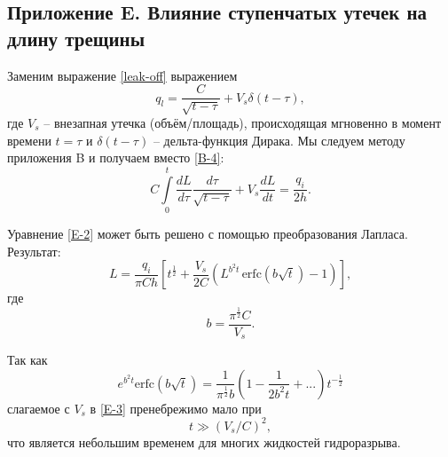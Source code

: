 \documentclass[a4paper, 11pt]{article}
\newcommand{\beq}{\begin{equation}}
\newcommand{\eeq}{\end{equation}}
\begin{document}
\subsection{Приложение E. Влияние ступенчатых утечек на длину трещины}

Заменим выражение \eqref{leak-off} выражением
\beq\label{E-1}
q_l=\frac{C}{\sqrt{t-\tau}}+V_s\delta(t-\tau),
\tag{E-1}
\eeq
где $V_s$ -- внезапная утечка (объём/площадь), происходящая мгновенно в момент времени $t=\tau$ и $\delta(t-\tau)$ -- дельта-функция Дирака.
Мы следуем методу приложения B и получаем вместо \eqref{B-4}:
\beq\label{E-2}
C\int\limits_{0}^{t}{\frac{dL}{d\tau}}\frac{d\tau}{\sqrt{t-\tau}}+V_s\frac{dL}{dt}=\frac{q_i}{2h}.
\tag{E-2}
\eeq

Уравнение \eqref{E-2} может быть решено с помощью преобразования Лапласа.
Результат:
\beq\label{E-3}
L=\frac{q_i}{\pi Ch}\left[t^{\frac{1}{2}}+\frac{V_s}{2C}\left(L^{b^2t}\,\textrm{erfc}\!\left(b\sqrt{t}\right)-1\right)\right],
\tag{E-3}
\eeq
где
$$
b=\frac{\pi^{\frac{1}{2}}C}{V_s}.
$$

Так как
\beq\label{E-4}
e^{b^2t}\textrm{erfc}\!\left(b\sqrt{t}\right)=\frac{1}{\pi^{\frac{1}{2}}b}\left(1-\frac{1}{2b^2t}+...\right)t^{-\frac{1}{2}}
\tag{E-4}
\eeq
слагаемое с $V_s$ в \eqref{E-3} пренебрежимо мало при
\beq\label{E-5}
t\gg(V_s/C)^2,
\tag{E-5}
\eeq
что является небольшим временем для многих жидкостей гидроразрыва.
\end{document}
